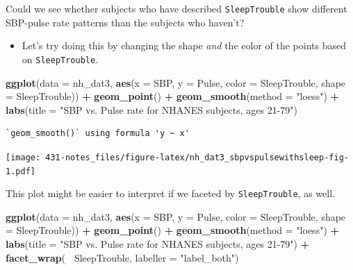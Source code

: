 \documentclass[
]{book}
\newenvironment{Shaded}{\begin{snugshade}}{\end{snugshade}}
\newcommand{\DataTypeTok}[1]{\textcolor[rgb]{0.13,0.29,0.53}{#1}}
\newcommand{\KeywordTok}[1]{\textcolor[rgb]{0.13,0.29,0.53}{\textbf{#1}}}
\newcommand{\NormalTok}[1]{#1}
\newcommand{\OperatorTok}[1]{\textcolor[rgb]{0.81,0.36,0.00}{\textbf{#1}}}
\newcommand{\StringTok}[1]{\textcolor[rgb]{0.31,0.60,0.02}{#1}}
\providecommand{\tightlist}{%
  \setlength{\itemsep}{0pt}\setlength{\parskip}{0pt}}
\begin{document}
Could we see whether subjects who have described \texttt{SleepTrouble} show different SBP-pulse rate patterns than the subjects who haven't?

\begin{itemize}
\tightlist
\item
  Let's try doing this by changing the shape \emph{and} the color of the points based on \texttt{SleepTrouble}.
\end{itemize}

\begin{Shaded}
\begin{Highlighting}[]
\KeywordTok{ggplot}\NormalTok{(}\DataTypeTok{data =}\NormalTok{ nh_dat3, }
       \KeywordTok{aes}\NormalTok{(}\DataTypeTok{x =}\NormalTok{ SBP, }\DataTypeTok{y =}\NormalTok{ Pulse, }
           \DataTypeTok{color =}\NormalTok{ SleepTrouble, }\DataTypeTok{shape =}\NormalTok{ SleepTrouble)) }\OperatorTok{+}
\StringTok{    }\KeywordTok{geom_point}\NormalTok{() }\OperatorTok{+}
\StringTok{    }\KeywordTok{geom_smooth}\NormalTok{(}\DataTypeTok{method =} \StringTok{"loess"}\NormalTok{) }\OperatorTok{+}
\StringTok{    }\KeywordTok{labs}\NormalTok{(}\DataTypeTok{title =} \StringTok{"SBP vs. Pulse rate for NHANES subjects, ages 21-79"}\NormalTok{)}
\end{Highlighting}
\end{Shaded}

\begin{verbatim}
`geom_smooth()` using formula 'y ~ x'
\end{verbatim}

\texttt{[image: 431-notes\_files/figure-latex/nh\_dat3\_sbpvspulsewithsleep-fig-1.pdf]}

This plot might be easier to interpret if we faceted by \texttt{SleepTrouble}, as well.

\begin{Shaded}
\begin{Highlighting}[]
\KeywordTok{ggplot}\NormalTok{(}\DataTypeTok{data =}\NormalTok{ nh_dat3, }
       \KeywordTok{aes}\NormalTok{(}\DataTypeTok{x =}\NormalTok{ SBP, }\DataTypeTok{y =}\NormalTok{ Pulse, }
           \DataTypeTok{color =}\NormalTok{ SleepTrouble, }\DataTypeTok{shape =}\NormalTok{ SleepTrouble)) }\OperatorTok{+}
\StringTok{    }\KeywordTok{geom_point}\NormalTok{() }\OperatorTok{+}
\StringTok{    }\KeywordTok{geom_smooth}\NormalTok{(}\DataTypeTok{method =} \StringTok{"loess"}\NormalTok{) }\OperatorTok{+}
\StringTok{    }\KeywordTok{labs}\NormalTok{(}\DataTypeTok{title =} \StringTok{"SBP vs. Pulse rate for NHANES subjects, ages 21-79"}\NormalTok{) }\OperatorTok{+}
\StringTok{    }\KeywordTok{facet_wrap}\NormalTok{(}\OperatorTok{~}\StringTok{ }\NormalTok{SleepTrouble, }\DataTypeTok{labeller =} \StringTok{"label_both"}\NormalTok{)}
\end{Highlighting}
\end{Shaded}
\end{document}
